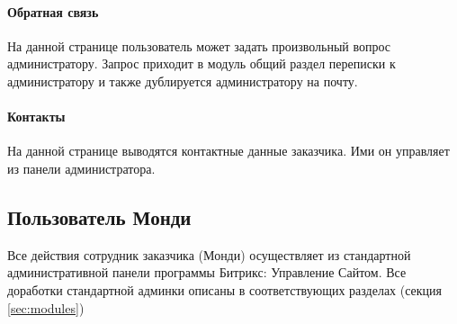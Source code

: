 \documentclass[DIV=calc, paper=a4, fontsize=11pt]{scrartcl} %
\newcommand{\clientName}{Монди}
\begin{document}
\paragraph{Обратная связь}
На данной странице пользователь может задать произвольный вопрос администратору. Запрос приходит в модуль общий раздел переписки к администратору и также дублируется администратору на почту.

\paragraph{Контакты}
На данной странице выводятся контактные данные заказчика. Ими он управляет из панели администратора.

\subsection{Пользователь \clientName}

Все действия сотрудник заказчика (\clientName) осуществляет из стандартной административной панели программы Битрикс: Управление Сайтом. Все доработки стандартной админки описаны в соответствующих разделах (секция \ref{sec:modules})
\end{document}
